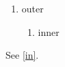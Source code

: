 \documentclass{article}
\begin{document}
\begin{enumerate}[label=(\alph*)]
\item outer
\begin{enumerate}[label=\roman*.,ref=\theenumi.\roman*]
\item\label{in} inner
\end{enumerate}
\end{enumerate}
See \ref{in}.
\end{document}
